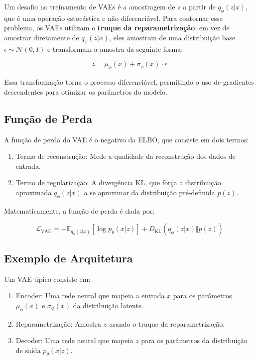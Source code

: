 \documentclass{tufte-handout}
\begin{document}
Um desafio no treinamento de VAEs é a amostragem de $z$ a partir de $q_{\phi}(z|x)$, que é uma operação estocástica e não diferenciável. Para contornar esse problema, os VAEs utilizam o \textbf{truque da reparametrização}: em vez de amostrar diretamente de $q_{\phi}(z|x)$, eles amostram de uma distribuição base $\epsilon \sim \mathcal{N}(0, I)$ e transformam a amostra da seguinte forma:

\begin{equation}
    z = \mu_{\phi}(x) + \sigma_{\phi}(x) \cdot \epsilon
\end{equation}

Essa transformação torna o processo diferenciável, permitindo o uso de gradientes descendentes para otimizar os parâmetros do modelo.

\subsection{Função de Perda}

A função de perda do VAE é o negativo da ELBO, que consiste em dois termos:
\begin{enumerate}
    \item Termo de reconstrução: Mede a qualidade da reconstrução dos dados de entrada.
    \item Termo de regularização: A divergência KL, que força a distribuição aproximada $q_{\phi}(z|x)$ a se aproximar da distribuição pré-definida $p(z)$.
\end{enumerate}

Matematicamente, a função de perda é dada por:

\begin{equation}
    \mathcal{L}_{\text{VAE}} = -\mathbb{E}_{q_{\phi}(z|x)} \left[ \log p_{\theta}(x|z) \right] + D_{\text{KL}}(q_{\phi}(z|x) \Vert p(z))
\end{equation}

\subsection{Exemplo de Arquitetura}

Um VAE típico consiste em:
\begin{enumerate}
    \item Encoder: Uma rede neural que mapeia a entrada $x$ para os parâmetros $\mu_{\phi}(x)$ e $\sigma_{\phi}(x)$ da distribuição latente.
    \item Reparametrização: Amostra $z$ usando o truque da reparametrização.
    \item Decoder: Uma rede neural que mapeia $z$ para os parâmetros da distribuição de saída $p_{\theta}(x|z)$.
\end{enumerate}
\end{document}
